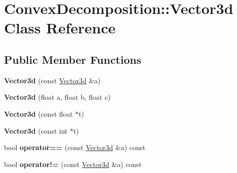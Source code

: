\hypertarget{class_convex_decomposition_1_1_vector3d}{\section{Convex\+Decomposition\+:\+:Vector3d Class Reference}
\label{class_convex_decomposition_1_1_vector3d}
}
\subsection*{Public Member Functions}
\begin{DoxyCompactItemize}
\item 
\hypertarget{class_convex_decomposition_1_1_vector3d_a37d34b0d9fb8a0ea85ee9f58fe77289b}{{\bfseries Vector3d} (const \hyperlink{class_convex_decomposition_1_1_vector3d}{Vector3d} \&a)}\label{class_convex_decomposition_1_1_vector3d_a37d34b0d9fb8a0ea85ee9f58fe77289b}

\item 
\hypertarget{class_convex_decomposition_1_1_vector3d_ac20b83c92bd7ebf30ce3760a73049b60}{{\bfseries Vector3d} (float a, float b, float c)}\label{class_convex_decomposition_1_1_vector3d_ac20b83c92bd7ebf30ce3760a73049b60}

\item 
\hypertarget{class_convex_decomposition_1_1_vector3d_afb854f07270ce74b336986cbdc332136}{{\bfseries Vector3d} (const float $\ast$t)}\label{class_convex_decomposition_1_1_vector3d_afb854f07270ce74b336986cbdc332136}

\item 
\hypertarget{class_convex_decomposition_1_1_vector3d_a79671844a36a5b07d67575bdc4ff7902}{{\bfseries Vector3d} (const int $\ast$t)}\label{class_convex_decomposition_1_1_vector3d_a79671844a36a5b07d67575bdc4ff7902}

\item 
\hypertarget{class_convex_decomposition_1_1_vector3d_a4c9e20fe008a290003dd52ad6a559a01}{bool {\bfseries operator==} (const \hyperlink{class_convex_decomposition_1_1_vector3d}{Vector3d} \&a) const }\label{class_convex_decomposition_1_1_vector3d_a4c9e20fe008a290003dd52ad6a559a01}

\item 
\hypertarget{class_convex_decomposition_1_1_vector3d_addbef70e64e644a06024489d0baedede}{bool {\bfseries operator!=} (const \hyperlink{class_convex_decomposition_1_1_vector3d}{Vector3d} \&a) const }\label{class_convex_decomposition_1_1_vector3d_addbef70e64e644a06024489d0baedede}


\end{DoxyCompactItemize}
